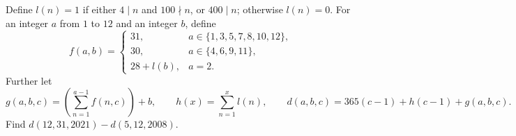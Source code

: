 Define $l(n)=1$ if either $4\mid n$ and $100\nmid n$, or $400\mid n$; otherwise $l(n)=0$. For an integer $a$ from $1$ to $12$ and an integer $b$, define
\[f(a,b)=\begin{cases}31,&a\in\{1,3,5,7,8,10,12\},\\30,&a\in\{4,6,9,11\},\\28+l(b),&a=2.\end{cases}\]
Further let
\[g(a,b,c)=\left(\sum_{n=1}^{a-1}f(n,c)\right)+b,\qquad h(x)=\sum_{n=1}^{x}l(n),\qquad d(a,b,c)=365(c-1)+h(c-1)+g(a,b,c).\]
Find $d(12,31,2021)-d(5,12,2008)$.
